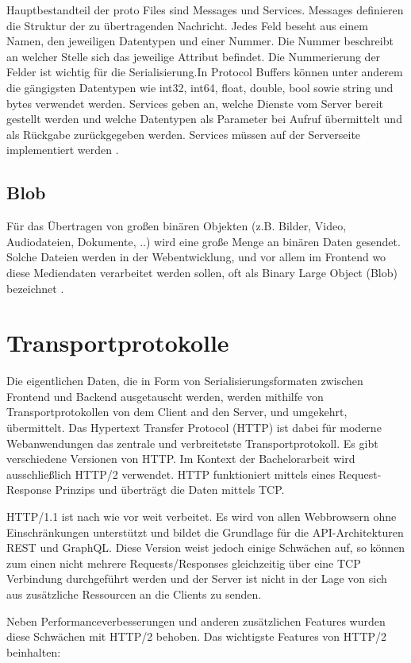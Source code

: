 Hauptbestandteil der proto Files sind Messages und Services.
Messages definieren die Struktur der zu übertragenden Nachricht. Jedes Feld beseht aus einem Namen, den jeweiligen Datentypen und einer Nummer. Die Nummer beschreibt an welcher Stelle sich das jeweilige Attribut befindet. Die Nummerierung der Felder ist wichtig für die Serialisierung.In Protocol Buffers können unter anderem die gängigsten Datentypen wie int32, int64, float, double, bool sowie string und bytes verwendet werden.
Services geben an, welche Dienste vom Server bereit gestellt werden und welche Datentypen als Parameter bei Aufruf übermittelt und als Rückgabe zurückgegeben werden. Services müssen auf der Serverseite implementiert werden \parencite{protobufdocs}.


\subsection{Blob}
Für das Übertragen von großen binären Objekten (z.B. Bilder, Video, Audiodateien, Dokumente, ..) wird eine große Menge an binären Daten gesendet. Solche Dateien werden in der Webentwicklung, und vor allem im Frontend wo diese Mediendaten verarbeitet werden sollen, oft als Binary Large Object (Blob) bezeichnet \parencite{w3c-fileapi}.

\section{Transportprotokolle}
Die eigentlichen Daten, die in Form von Serialisierungsformaten zwischen Frontend und Backend ausgetauscht werden, werden mithilfe von Transportprotokollen von dem Client and den Server, und umgekehrt, übermittelt. Das Hypertext Transfer Protocol (HTTP) ist dabei für moderne Webanwendungen das zentrale und verbreitetste Transportprotokoll. Es gibt verschiedene Versionen von HTTP. Im Kontext der Bachelorarbeit wird ausschließlich HTTP/2 verwendet. HTTP funktioniert mittels eines Request-Response Prinzips und überträgt die Daten mittels TCP.

HTTP/1.1 ist nach wie vor weit verbeitet. Es wird von allen Webbrowsern ohne Einschränkungen unterstützt und bildet die Grundlage für die API-Architekturen REST und GraphQL. Diese Version weist jedoch einige Schwächen auf, so können zum einen nicht mehrere Requests/Responses gleichzeitig über eine TCP Verbindung durchgeführt werden und der Server ist nicht in der Lage von sich aus zusätzliche Ressourcen an die Clients zu senden. 

Neben Performanceverbesserungen und anderen zusätzlichen Features wurden diese Schwächen mit HTTP/2 behoben.
Das wichtigste Features von HTTP/2 beinhalten:


